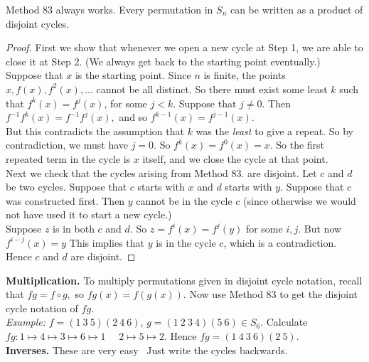 \begin{proposition} Method 83 always works. Every permutation in $S_n$ can be written as a product of disjoint cycles.	
\end{proposition}


\begin{proof}
	First we show that whenever we open a new cycle at Step 1, we are able to close it at Step 2. (We always get back to the starting point eventually.)\\
	
	Suppose that $x$ is the starting point. Since $n$ is finite, the points $x, f(x), f^2(x),\dots$ cannot be all distinct. So there must exist some least $k$ such that $f^k(x) = f^j(x)$, for some $j < k$. Suppose that $j \neq 0$. Then $f^{-1}f^k(x) = f^{-1}f^j(x),$ and so $f^{k-1}(x) = f^{j-1}(x)$.\\
	
	 But this contradicts the assumption that $k$ was the \emph{least} to give a repeat. So by contradiction, we must have $j = 0$. So $f^k(x) = f^0(x) = x$. So the first repeated term in the cycle is $x$ itself, and we close the cycle at that point.\\
	 
	 Next we check that the cycles arising from Method 83. are disjoint. Let $c$ and $d$ be two cycles. Suppose that $c$ starts with $x$ and $d$ starts with $y$. Suppose that $c$ was constructed first. Then $y$ cannot be in the cycle $c$ (since otherwise we would not have used it to start a new cycle.)\\
	 
	 Suppose $z$ is in both $c$ and $d$. So $z = f^i(x) = f^j(y)$ for some $i,j$. But now $f^{i-j}(x) = y$ This implies that $y$ is in the cycle $c$, which is a contradiction. Hence $c$ and $d$ are disjoint.
\end{proof}\vspace*{10pt}


\noindent \textbf{Multiplication.} To multiply permutations given in disjoint cycle notation, recall that $fg = f \circ g,$ so $fg(x) = f(g(x))$. Now use Method 83 to get the disjoint cycle notation of $fg$. \\

\textit{Example:} $f = (1~3~5)(2~4~6)$, $g = (1~2~3~4)(5~6) \in S_6$. Calculate $fg: 1 \mapsto 4 \mapsto 3 \mapsto 6 \mapsto 1\quad $ $2\mapsto 5 \mapsto 2$. Hence $fg = (1~4~3~6)(2~5)$.\\
 
 
 \noindent \textbf{Inverses.} These are very easy~ Just write the cycles backwards.\\ 
 
